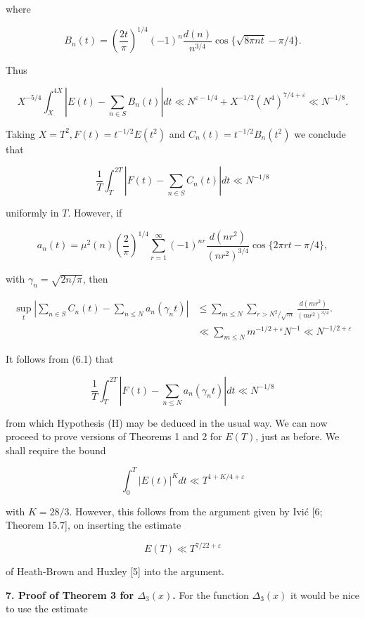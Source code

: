 \documentclass[10pt]{article}
\newcommand{\articleSection}[2]{%
  \par\medskip\noindent\textbf{#1. #2.}\enspace
}
\begin{document}
where

$$
B_{n}(t)=\left(\frac{2 t}{\pi}\right)^{1 / 4}(-1)^{n} \frac{d(n)}{n^{3 / 4}} \cos \{\sqrt{8 \pi n t}-\pi / 4\} .
$$

Thus

$$
X^{-5 / 4} \int_{X}^{4 X}\left|E(t)-\sum_{n \in S} B_{n}(t)\right| d t \ll N^{\varepsilon-1 / 4}+X^{-1 / 2}\left(N^{4}\right)^{7 / 4+\varepsilon} \ll N^{-1 / 8} .
$$

Taking $X=T^{2}, F(t)=t^{-1 / 2} E\left(t^{2}\right)$ and $C_{n}(t)=t^{-1 / 2} B_{n}\left(t^{2}\right)$ we conclude that


\begin{equation*}
\frac{1}{T} \int_{T}^{2 T}\left|F(t)-\sum_{n \in S} C_{n}(t)\right| d t \ll N^{-1 / 8} \tag{6.1}
\end{equation*}


uniformly in $T$. However, if

$$
a_{n}(t)=\mu^{2}(n)\left(\frac{2}{\pi}\right)^{1 / 4} \sum_{r=1}^{\infty}(-1)^{n r} \frac{d\left(n r^{2}\right)}{\left(n r^{2}\right)^{3 / 4}} \cos \{2 \pi r t-\pi / 4\},
$$

with $\gamma_{n}=\sqrt{2 n / \pi}$, then


\begin{align*}
\sup _{t}\left|\sum_{n \in S} C_{n}(t)-\sum_{n \leq N} a_{n}\left(\gamma_{n} t\right)\right| & \leq \sum_{m \leq N} \sum_{r>N^{2} / \sqrt{m}} \frac{d\left(m r^{2}\right)}{\left(m r^{2}\right)^{3 / 4}}. \tag{6.2}\\
& \ll \sum_{m \leq N} m^{-1 / 2+\varepsilon} N^{-1} \ll N^{-1 / 2+\varepsilon}
\end{align*}


It follows from (6.1) that

$$
\frac{1}{T} \int_{T}^{2 T}\left|F(t)-\sum_{n \leq N} a_{n}\left(\gamma_{n} t\right)\right| d t \ll N^{-1 / 8}
$$

from which Hypothesis (H) may be deduced in the usual way. We can now proceed to prove versions of Theorems 1 and 2 for $E(T)$, just as before. We shall require the bound

$$
\int_{0}^{T}|E(t)|^{K} d t \ll T^{1+K / 4+\varepsilon}
$$

with $K=28 / 3$. However, this follows from the argument given by Ivić [6; Theorem 15.7], on inserting the estimate

$$
E(T) \ll T^{7 / 22+\varepsilon}
$$

of Heath-Brown and Huxley [5] into the argument.

\articleSection{7}{Proof of Theorem 3 for $\Delta_{3}(x)$}For the function $\Delta_{3}(x)$ it would be nice to use the estimate
\end{document}
